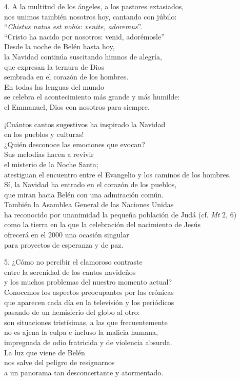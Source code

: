 4. A la multitud de los ángeles, a los pastores extasiados,\\
nos unimos también nosotros hoy, cantando con júbilo:\\
``\emph{Chistus natus est nobis: venite, adoremus}''.\\
``Cristo ha nacido por nosotros: venid, adorémosle''\\
Desde la noche de Belén hasta hoy,\\
la Navidad continúa suscitando himnos de alegría,\\
que expresan la ternura de Dios\\
sembrada en el corazón de los hombres.\\
En todas las lenguas del mundo\\
se celebra el acontecimiento más grande y más humilde:\\
el Emmanuel, Dios con nosotros para siempre.

¡Cuántos cantos sugestivos ha inspirado la Navidad\\
en los pueblos y culturas!\\
¿Quién desconoce las emociones que evocan?\\
Sus melodías hacen a revivir\\
el misterio de la Noche Santa;\\
atestiguan el encuentro entre el Evangelio y los caminos de los
hombres.\\
Sí, la Navidad ha entrado en el corazón de los pueblos,\\
que miran hacia Belén con una admiración común.\\
También la Asamblea General de las Naciones Unidas\\
ha reconocido por unanimidad la pequeña población de Judá (cf. \emph{Mt}
2, 6)\\
como la tierra en la que la celebración del nacimiento de Jesús\\
ofrecerá en el 2000 una ocasión singular\\
para proyectos de esperanza y de paz.

5. ¿Cómo no percibir el clamoroso contraste\\
entre la serenidad de los cantos navideños\\
y los muchos problemas del nuestro momento actual?\\
Conocemos los aspectos preocupantes por las crónicas\\
que aparecen cada día en la televisión y los periódicos\\
pasando de un hemisferio del globo al otro:\\
son situaciones tristísimas, a las que frecuentemente\\
no es ajena la culpa e incluso la malicia humana,\\
impregnada de odio fratricida y de violencia absurda.\\
La luz que viene de Belén\\
nos salve del peligro de resignarnos\\
a un panorama tan desconcertante y atormentado.

